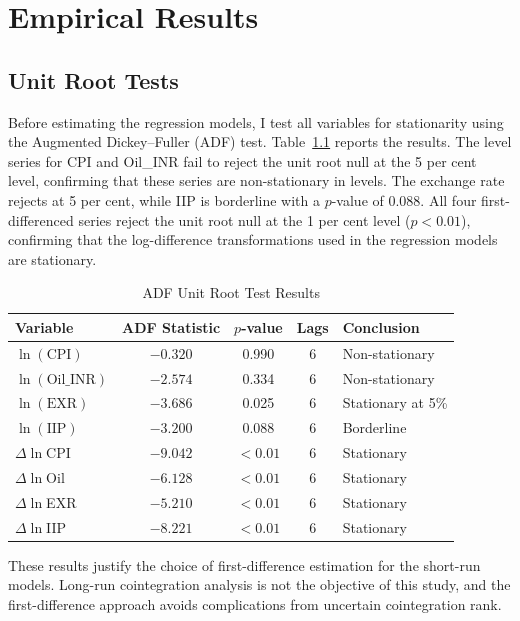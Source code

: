 \chapter{Empirical Results}
\label{ch:results}

\section{Unit Root Tests}

Before estimating the regression models, I test all variables for stationarity using the Augmented Dickey--Fuller (ADF) test. Table~\ref{tab:adf} reports the results. The level series for CPI and Oil\_INR fail to reject the unit root null at the 5 per cent level, confirming that these series are non-stationary in levels. The exchange rate rejects at 5 per cent, while IIP is borderline with a $p$-value of 0.088. All four first-differenced series reject the unit root null at the 1 per cent level ($p < 0.01$), confirming that the log-difference transformations used in the regression models are stationary.

\begin{table}[H]
\centering
\caption{ADF Unit Root Test Results}
\label{tab:adf}
\begin{tabular}{lcccl}
\toprule
\textbf{Variable} & \textbf{ADF Statistic} & \textbf{$p$-value} & \textbf{Lags} & \textbf{Conclusion} \\
\midrule
$\ln(\text{CPI})$ & $-0.320$ & 0.990 & 6 & Non-stationary \\
$\ln(\text{Oil\_INR})$ & $-2.574$ & 0.334 & 6 & Non-stationary \\
$\ln(\text{EXR})$ & $-3.686$ & 0.025 & 6 & Stationary at 5\% \\
$\ln(\text{IIP})$ & $-3.200$ & 0.088 & 6 & Borderline \\
\midrule
$\Delta\ln$CPI & $-9.042$ & $<0.01$ & 6 & Stationary \\
$\Delta\ln$Oil & $-6.128$ & $<0.01$ & 6 & Stationary \\
$\Delta\ln$EXR & $-5.210$ & $<0.01$ & 6 & Stationary \\
$\Delta\ln$IIP & $-8.221$ & $<0.01$ & 6 & Stationary \\
\bottomrule
\end{tabular}
\end{table}

These results justify the choice of first-difference estimation for the short-run models. Long-run cointegration analysis is not the objective of this study, and the first-difference approach avoids complications from uncertain cointegration rank.

